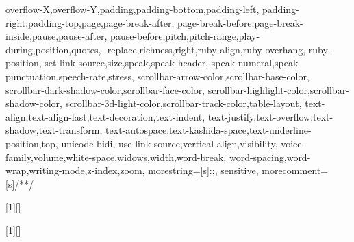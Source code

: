 {{    overflow-X,overflow-Y,padding,padding-bottom,padding-left,
    padding-right,padding-top,page,page-break-after,
    page-break-before,page-break-inside,pause,pause-after,
    pause-before,pitch,pitch-range,play-during,position,quotes,
    -replace,richness,right,ruby-align,ruby-overhang,
    ruby-position,-set-link-source,size,speak,speak-header,
    speak-numeral,speak-punctuation,speech-rate,stress,
    scrollbar-arrow-color,scrollbar-base-color,
    scrollbar-dark-shadow-color,scrollbar-face-color,
    scrollbar-highlight-color,scrollbar-shadow-color,
    scrollbar-3d-light-color,scrollbar-track-color,table-layout,
    text-align,text-align-last,text-decoration,text-indent,
    text-justify,text-overflow,text-shadow,text-transform,
    text-autospace,text-kashida-space,text-underline-position,top,
    unicode-bidi,-use-link-source,vertical-align,visibility,
    voice-family,volume,white-space,widows,width,word-break,
    word-spacing,word-wrap,writing-mode,z-index,zoom},
  morestring=[s]{:}{;},
  sensitive,
  morecomment=[s]{/*}{*/}
}

[1][]
  {}
  {}



 {}
 {}
 
[1][]
 {}
 {}



